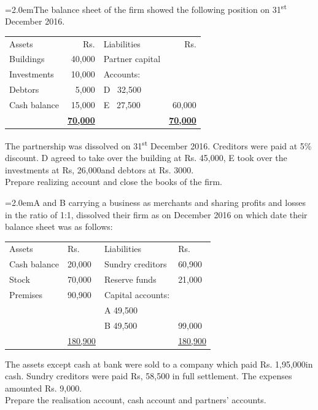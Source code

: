 \documentclass[11pt,a4paper]{article}
\newcommand{\lqn}[2]{\Needspace{6\baselineskip}\par\medskip\noindent\hangindent=2.0em\hangafter=1\makebox[2.0em][l]{\textbf{#1.}}#2\par}
\begin{document}
\lqn{108}{The balance sheet of the firm showed the following position on 31\textsuperscript{st}  December 2016.\par
\par\smallskip\noindent\hspace*{1.2em}\begin{tabular}{|lrlr|}
\hline
Assets & Rs. & Liabilities & Rs.\\
Buildings & 40,000 & Partner capital &\\
Investments & 10,000 & Accounts: &\\
Debtors & 5,000 & D \ 32,500 &\\
Cash balance & 15,000 & E \ 27,500 & 60,000\\
 & \textbf{\underline{70,000}} & & \textbf{\underline{70,000}}\\
\hline
\end{tabular}\par\smallskip
The partnership was dissolved on 31\textsuperscript{st} December 2016. Creditors were paid at 5\% discount. D agreed to take over the building at Rs. 45,000, E took over the investments at Rs, 26,000and debtors at Rs. 3000.\\
Prepare realizing account and close the books of the firm.\par
}
\lqn{109}{A and B carrying a business as merchants and sharing profits and losses in the ratio of 1:1, dissolved their firm as on December 2016 on which date their balance sheet was as follows:\par
\par\smallskip\noindent\hspace*{1.2em}\begin{tabular}{|llll|}
\hline
Assets & Rs. & Liabilities & Rs. \\
Cash balance & 20,000 & Sundry creditors & 60,900 \\
Stock & 70,000 & Reserve funds & 21,000 \\
Premises & 90,900 & Capital accounts: &  \\
 &  & A               49,500 &  \\
 &  & B               49,500 & 99,000 \\
 & \underline{180,900} &  & \underline{180,900} \\
\hline
\end{tabular}\par\smallskip
The assets except cash at bank were sold to a company which paid Rs. 1,95,000in cash. Sundry creditors were paid Rs, 58,500 in full settlement. The expenses amounted Rs. 9,000.\\
Prepare the realisation account, cash account and partners’ accounts.\par
}
\end{document}
